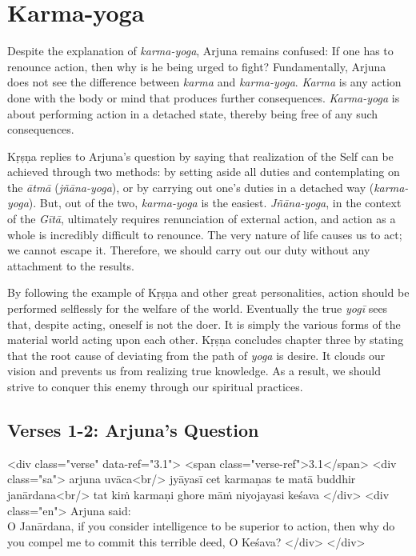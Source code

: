 \chapter{Karma-yoga}\label{chap-karma-yoga}

\noindent Despite the explanation of \textit{karma-yoga}, Arjuna remains confused: If one has to renounce action, then why is he being urged to fight? Fundamentally, Arjuna does not see the difference between \textit{karma} and \textit{karma-yoga}. \textit{Karma} is any action done with the body or mind that produces further consequences. \textit{Karma-yoga} is about performing action in a detached state, thereby being free of any such consequences.

Kṛṣṇa replies to Arjuna’s question by saying that realization of the Self can be achieved through two methods: by setting aside all duties and contemplating on the \textit{ātmā} (\textit{jñāna-yoga}), or by carrying out one’s duties in a detached way (\textit{karma-yoga}). But, out of the two, \textit{karma-yoga} is the easiest. \textit{Jñāna-yoga}, in the context of the \textit{Gītā}, ultimately requires renunciation of external action, and action as a whole is incredibly difficult to renounce. The very nature of life causes us to act; we cannot escape it. Therefore, we should carry out our duty without any attachment to the results.

By following the example of Kṛṣṇa and other great personalities, action should be performed selflessly for the welfare of the world. Eventually the true \textit{yogī} sees that, despite acting, oneself is not the doer. It is simply the various forms of the material world acting upon each other. Kṛṣṇa concludes chapter three by stating that the root cause of deviating from the path of \textit{yoga} is desire. It clouds our vision and prevents us from realizing true knowledge. As a result, we should strive to conquer this enemy through our spiritual practices.

\section{Verses 1-2: Arjuna's Question}\label{sec-verses-1-2-arjuna-s-question}

\begin{html}
<div class="verse" data-ref="3.1">
  <span class="verse-ref">3.1</span>
  <div class="sa">
    arjuna uvāca<br/>
    jyāyasī cet karmaṇas te matā buddhir janārdana<br/>
    tat kiṁ karmaṇi ghore māṁ niyojayasi keśava
  </div>
  <div class="en">
    \hspace*{1em}Arjuna said: \\ O Janārdana, if you consider intelligence to be superior to action, then why do you compel me to commit this terrible deed, O Keśava?
  </div>
</div>
\end{html}



